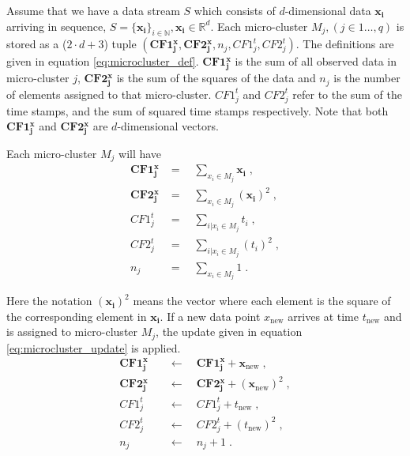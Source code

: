 Assume that we have a data stream $S$ which consists of $d$-dimensional data $\boldsymbol{x_i}$ arriving in sequence, $S = \{\boldsymbol{x_i} \}_{i \in \mathbb{N}}, \boldsymbol{x_i} \in \mathbb{R}^d$. Each micro-cluster $M_j, (j \in 1 \ldots, q)$ is stored as a ($2 \cdot d + 3$) tuple $(\boldsymbol{CF1^x_j}, \boldsymbol{CF2^x_j}, n_j, CF1^t_j, CF2^t_j)$. The definitions are given in equation \eqref{eq:microcluster_def}. $\boldsymbol{CF1^x_j}$ is the sum of all observed data in micro-cluster $j$, $\boldsymbol{CF2^x_j}$ is the sum of the squares of the data and $n_j$ is the number of elements assigned to that micro-cluster. $CF1^t_j$ and $CF2^t_j$ refer to the sum of the time stamps, and the sum of squared time stamps respectively. Note that both $\boldsymbol{CF1^x_j}$ and $\boldsymbol{CF2^x_j}$ are $d$-dimensional vectors.

Each micro-cluster $M_j$ will have 
\begin{align}
\boldsymbol{CF1^x_j} &= \quad \sum_{x_i \in M_j}{\boldsymbol{x_i}} \; , \nonumber  \\ 
\boldsymbol{CF2^x_j} &= \quad \sum_{x_i \in M_j}{(\boldsymbol{x_i})^2} \; , \nonumber\\
CF1^t_j &= \quad \sum_{i | x_i \in M_j}{t_i} \; , \nonumber   \\
CF2^t_j &= \quad\sum_{i | x_i \in M_j}{(t_i)^2} \; , \nonumber\\
n_j &= \quad \sum_{x_i \in M_j}{1} \; .
\label{eq:microcluster_def}
\end{align}

Here the notation $(\boldsymbol{x_i})^2$ means the vector where each element is the square of the corresponding element in $\boldsymbol{x_i}$. If a new data point $x_{\text{new}}$ arrives at time $t_{\text{new}}$ and is assigned to micro-cluster $M_j$, the  update  given in equation \eqref{eq:microcluster_update} is applied. 
\begin{align}
\boldsymbol{CF1^x_j} \quad &\leftarrow \quad \boldsymbol{CF1^x_j} + \boldsymbol{x}_{\text{new}} \; , \nonumber  \\ 
\boldsymbol{CF2^x_j} \quad &\leftarrow \quad \boldsymbol{CF2^x_j} + (\boldsymbol{x}_{\text{new}})^2 \; , \nonumber\\
CF1^t_j \quad &\leftarrow \quad  CF1^t_j + t_{\text{new}} \; , \nonumber   \\
CF2^t_j \quad &\leftarrow \quad CF2^t_j + (t_{\text{new}})^2 \; , \nonumber\\
n_j  \quad &\leftarrow \quad n_j + 1 \; .
\label{eq:microcluster_update}
\end{align}

